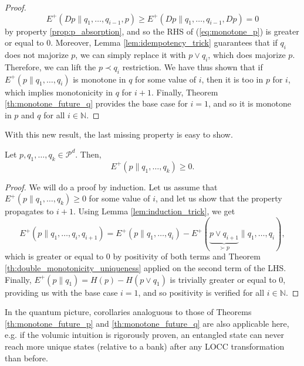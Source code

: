 \begin{proof}
    \begin{equation}
        E^+(Dp \parallel q_1, \dots, q_{i-1}, p) \geq E^+(Dp \parallel q_1, \dots, q_{i-1}, Dp) = 0
    \end{equation}
    by property \ref{prop:p_absorption}, and so the RHS of (\ref{eq:monotone_p}) is greater or equal to 0. Moreover, Lemma \ref{lem:idempotency_trick} guarantees that if $q_i$ does not majorize $p$, we can simply replace it with $p \vee q_i$, which does majorize $p$. Therefore, we can lift the $p \prec q_i$ restriction. We have thus shown that if $E^+(p \parallel q_1, \dots, q_i)$ is monotone in $q$ for some value of $i$, then it is too in $p$ for $i$, which implies monotonicity in $q$ for $i+1$. Finally, Theorem \ref{th:monotone_future_q} provides the base case for $i = 1$, and so it is monotone in $p$ and $q$ for all $i \in \mathbb{N}$. \qedhere
\end{proof}

\noindent With this new result, the last missing property is easy to show.

\begin{theorem} \label{th:positivity_uniqueness}
    Let $p, q_1, \dots, q_k \in \mathcal{P}^d$. Then,
    \begin{equation}
        E^+(p \parallel q_1, \dots, q_k) \geq 0.
    \end{equation}
\end{theorem}

\begin{proof}
    We will do a proof by induction. Let us assume that $E^+(p \parallel q_1, \dots, q_k) \geq 0$ for some value of $i$, and let us show that the property propagates to $i+1$. Using Lemma \ref{lem:induction_trick}, we get
    \begin{equation}
        E^+(p \parallel q_1, \dots, q_i, q_{i+1}) = E^+(p \parallel q_1, \dots, q_i) - E^+(\underbrace{p \vee q_{i+1}}_{\succ p} \parallel q_1, \dots, q_i),
    \end{equation}
    which is greater or equal to 0 by positivity of both terms and Theorem \ref{th:double_monotonicity_uniqueness} applied on the second term of the LHS. Finally, $E^+(p \parallel q_1) = H(p) - H(p \vee q_1)$ is trivially greater or equal to 0, providing us with the base case $i = 1$, and so positivity is verified for all $i \in \mathbb{N}$. \qedhere
\end{proof}

In the quantum picture, corollaries analoguous to those of Theorems \ref{th:monotone_future_p} and \ref{th:monotone_future_q} are also applicable here, e.g. if the volumic intuition is rigorously proven, an entangled state can never reach more unique states (relative to a bank) after any LOCC transformation than before.



